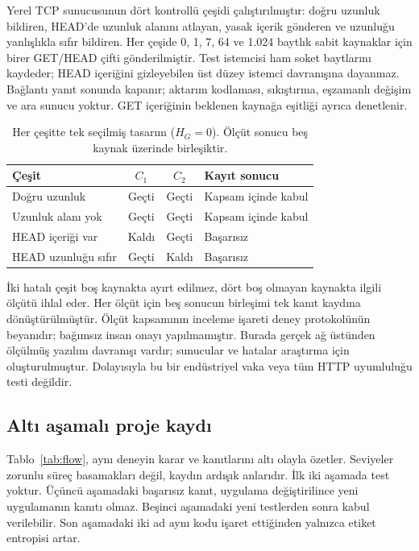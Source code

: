 \documentclass[runningheads]{llncs}
\begin{document}
Yerel TCP sunucusunun dört kontrollü çeşidi çalıştırılmıştır: doğru uzunluk bildiren, HEAD'de uzunluk alanını atlayan, yasak içerik gönderen ve uzunluğu yanlışlıkla sıfır bildiren. Her çeşide 0, 1, 7, 64 ve 1.024 baytlık sabit kaynaklar için birer GET/HEAD çifti gönderilmiştir. Test istemcisi ham soket baytlarını kaydeder; HEAD içeriğini gizleyebilen üst düzey istemci davranışına dayanmaz. Bağlantı yanıt sonunda kapanır; aktarım kodlaması, sıkıştırma, eşzamanlı değişim ve ara sunucu yoktur. GET içeriğinin beklenen kaynağa eşitliği ayrıca denetlenir.

\begin{table}[t]
\caption{Her çeşitte tek seçilmiş tasarım ($H_G=0$). Ölçüt sonucu beş kaynak üzerinde birleşiktir.}\label{tab:http}
\centering\small\setlength{\tabcolsep}{4pt}
\begin{tabular}{p{}ccp{}}
\toprule Çeşit & $C_1$ & $C_2$ & Kayıt sonucu\\\midrule
Doğru uzunluk & Geçti & Geçti & Kapsam içinde kabul\\
Uzunluk alanı yok & Geçti & Geçti & Kapsam içinde kabul\\
HEAD içeriği var & Kaldı & Geçti & Başarısız\\
HEAD uzunluğu sıfır & Geçti & Kaldı & Başarısız\\\bottomrule
\end{tabular}
\end{table}

İki hatalı çeşit boş kaynakta ayırt edilmez, dört boş olmayan kaynakta ilgili ölçütü ihlal eder. Her ölçüt için beş sonucun birleşimi tek kanıt kaydına dönüştürülmüştür. Ölçüt kapsamının inceleme işareti deney protokolünün beyanıdır; bağımsız insan onayı yapılmamıştır. Burada gerçek ağ üstünden ölçülmüş yazılım davranışı vardır; sunucular ve hatalar araştırma için oluşturulmuştur. Dolayısıyla bu bir endüstriyel vaka veya tüm HTTP uyumluluğu testi değildir.

\subsection{Altı aşamalı proje kaydı}
Tablo~\ref{tab:flow}, aynı deneyin karar ve kanıtlarını altı olayla özetler. Seviyeler zorunlu süreç basamakları değil, kaydın ardışık anlarıdır. İlk iki aşamada test yoktur. Üçüncü aşamadaki başarısız kanıt, uygulama değiştirilince yeni uygulamanın kanıtı olmaz. Beşinci aşamadaki yeni testlerden sonra kabul verilebilir. Son aşamadaki iki ad aynı kodu işaret ettiğinden yalnızca etiket entropisi artar.
\end{document}
